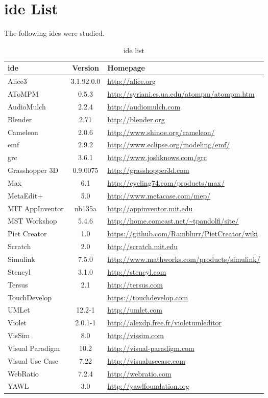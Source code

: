 \section{\acs{ide} List}
\label{sec:ide_list}

The following \acp{ide} were studied.

\noindent
\begin{table}[!htb]\centering
{}
\label{table:ides}
\begin{tabularx}{\textwidth}{@{}lcX@{}}\toprule
  \textbf{\ac{ide}} & \textbf{Version} & \textbf{Homepage} \\
  \midrule
  Alice3 & 3.1.92.0.0 & \url{http://alice.org} \\
  AToMPM & 0.5.3 & \url{http://syriani.cs.ua.edu/atompm/atompm.htm} \\
  AudioMulch & 2.2.4 & \url{http://audiomulch.com} \\
  Blender & 2.71 & \url{http://blender.org} \\
  Cameleon & 2.0.6 & \url{http://www.shinoe.org/cameleon/} \\
  \ac{emf} & 2.9.2 & \url{http://www.eclipse.org/modeling/emf/} \\
  \ac{grc} & 3.6.1 & \url{http://www.joshknows.com/grc} \\
  Grasshopper 3D & 0.9.0075 & \url{http://grasshopper3d.com} \\
  Max & 6.1 & \url{http://cycling74.com/products/max/} \\
  MetaEdit+ & 5.0 & \url{http://www.metacase.com/mep/} \\
  MIT AppInventor & nb135a & \url{http://appinventor.mit.edu} \\
  MST Workshop & 5.4.6 & \url{http://home.comcast.net/~tpandolfi/site/} \\
  Piet Creator & 1.0 & \url{https://github.com/Ramblurr/PietCreator/wiki} \\
  Scratch & 2.0 & \url{http://scratch.mit.edu} \\
  Simulink & 7.5.0 & \url{http://www.mathworks.com/products/simulink/} \\
  Stencyl & 3.1.0 & \url{http://stencyl.com} \\
  Tersus & 2.1 & \url{http://tersus.com} \\
  TouchDevelop & & \url{https://touchdevelop.com} \\
  UMLet & 12.2-1 & \url{http://umlet.com} \\
  Violet & 2.0.1-1 & \url{http://alexdp.free.fr/violetumleditor} \\
  VisSim & 8.0 & \url{http://vissim.com} \\
  Visual Paradigm & 10.2 & \url{http://visual-paradigm.com} \\
  Visual Use Case & 7.22 & \url{http://visualusecase.com} \\
  WebRatio & 7.2.4 & \url{http://webratio.com} \\
  YAWL & 3.0 & \url{http://yawlfoundation.org} \\
  \bottomrule
\end{tabularx}
\caption{\ac{ide} list}
\end{table}
